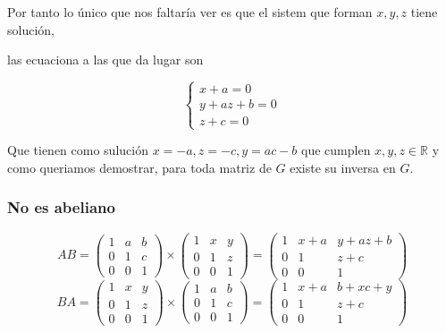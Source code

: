\documentclass[12pt]{article}
\begin{document}
\begin{enumerate}
    Por tanto lo único que nos faltaría ver es que el sistem que forman $x,y,z$ tiene solución, 
    
    las ecuaciona a las que da lugar son 

  \begin{equation*}
    \left\{
      \begin{array}{l}
         x + a = 0 \\
         y + az + b = 0 \\
         z +c = 0
      \end{array}
      \right.
  \end{equation*}


Que tienen como sulución $x = -a, z = -c, y = ac-b$
que cumplen $x,y,z \in \mathbb{R}$ y como queriamos demostrar, 
para toda matriz de $G$ existe su inversa en $G.$

\end{enumerate}

\subsubsection*{No es abeliano}


\begin{equation*}
    A B = 
    \begin{pmatrix}
        1 & a & b \\
        0 & 1 & c \\
        0 & 0 & 1
    \end{pmatrix}
    \times
    \begin{pmatrix}
        1 & x & y \\
        0 & 1 & z \\
        0 & 0 & 1
    \end{pmatrix}
    = 
    \begin{pmatrix}
    1 & x+a & y + az + b\\
    0 & 1 & z + c\\
    0 & 0 & 1
    \end{pmatrix}
\end{equation*}
\begin{equation*}
    BA = 
    \begin{pmatrix}
        1 & x & y \\
        0 & 1 & z \\
        0 & 0 & 1
    \end{pmatrix}
    \times
    \begin{pmatrix}
        1 & a & b \\
        0 & 1 & c \\
        0 & 0 & 1
    \end{pmatrix}
    = 
    \begin{pmatrix}
    1 & x+a & b + xc + y\\
    0 & 1 & z + c\\
    0 & 0 & 1
    \end{pmatrix}
\end{equation*}
\end{document}
